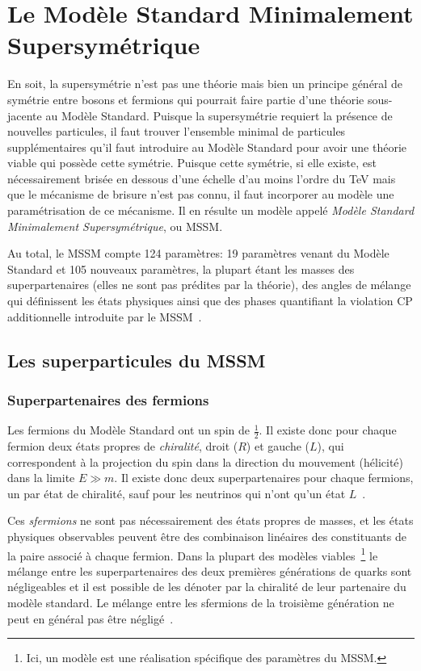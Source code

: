 \section{Le Modèle Standard Minimalement Supersymétrique}
\label{sec:susy:mssm}

En soit, la supersymétrie n'est pas une théorie mais bien un principe
général de symétrie entre bosons et fermions qui pourrait faire partie
d'une théorie sous-jacente au Modèle Standard. Puisque la
supersymétrie requiert la présence de nouvelles particules, il faut
trouver l'ensemble minimal de particules supplémentaires qu'il faut
introduire au Modèle Standard pour avoir une théorie viable qui
possède cette symétrie. Puisque cette symétrie, si elle existe, est
nécessairement brisée en dessous d'une échelle d'au moins l'ordre du
TeV mais que le mécanisme de brisure n'est pas connu, il faut
incorporer au modèle une paramétrisation de ce mécanisme. Il en
résulte un modèle appelé \emph{Modèle Standard Minimalement
  Supersymétrique}, ou MSSM.

Au total, le MSSM compte 124 paramètres: 19 paramètres venant du
Modèle Standard et 105 nouveaux paramètres, la plupart étant les
masses des superpartenaires (elles ne sont pas prédites par la
théorie), des angles de mélange qui définissent les états physiques
ainsi que des phases quantifiant la violation CP additionnelle
introduite par le MSSM~\cite{olive_susy1_2014}.

\subsection{Les superparticules du MSSM}
\label{sec:susy:mssm:sparticules}

\subsubsection{Superpartenaires des fermions}

Les fermions du Modèle Standard ont un spin de $\frac{1}{2}$. Il
existe donc pour chaque fermion deux états propres de
\emph{chiralité}, droit ($R$) et gauche ($L$), qui correspondent à la
projection du spin dans la direction du mouvement (hélicité) dans la limite
$E \gg m$. Il existe donc deux superpartenaires pour chaque
fermions, un par état de chiralité, sauf pour les neutrinos qui n'ont
qu'un état $L$~\cite{thomson_modern_2013}.

Ces \emph{sfermions} ne sont pas nécessairement des états propres de
masses, et les états physiques observables peuvent être des
combinaison linéaires des constituants de la paire associé à chaque
fermion. Dans la plupart des modèles viables~\footnote{Ici, un modèle est une r\'ealisation sp\'ecifique des param\`etres du MSSM.} le mélange entre les
superpartenaires des deux premières générations de quarks sont
négligeables et il est possible de les dénoter par la chiralité de leur
partenaire du modèle standard. Le mélange entre les sfermions de la
troisième génération ne peut en général pas être
négligé~\cite{aad_summary_2015}. 

